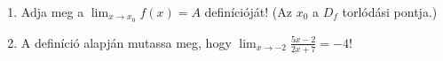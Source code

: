 \documentclass[11pt]{scrartcl}
\begin{document}
\begin{enumerate}
	\item Adja meg a $\lim_{x \to x_0} f(x) = A$ definícióját! (Az $x_0$ a
	      $D_f$ torlódási pontja.)

	\item A definíció alapján mutassa meg, hogy
	      \(\displaystyle \lim_{x \to -2} \frac{5x - 2}{2x + 7} = -4\)!
\end{enumerate}
\end{document}
